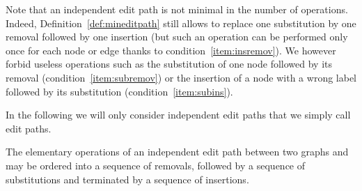 Note that an independent edit path is not minimal in the number of
operations. Indeed, Definition~\ref{def:mineditpath} still allows to
replace one substitution by one removal followed by one insertion
(but such an operation can be performed only once for each node or
edge thanks to condition~\ref{item:insremov}).  We however forbid useless
operations such as the substitution of one node followed by its
removal (condition~\ref{item:subremov}) or the insertion of a node
with a wrong label followed by its substitution
(condition~\ref{item:subins}).

In the following we will only
consider independent edit paths that we simply call edit paths.
\begin{proposition}
  The elementary operations of an independent edit path between two graphs
   and  may be ordered into a sequence of removals,
  followed by a sequence of substitutions and terminated by a
  sequence of insertions.
\end{proposition}
